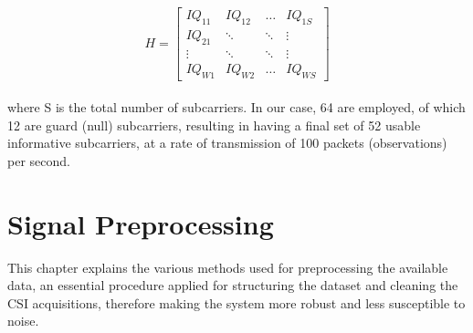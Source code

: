 \documentclass[binding=0.7cm, oneside]{sapthesis}
\begin{document}
\[
    H = \begin{bmatrix}
        IQ_{11} & IQ_{12} & \dots  & IQ_{1S} \\
        IQ_{21} & \ddots  & \ddots & \vdots  \\
        \vdots  & \ddots  & \ddots & \vdots  \\
        IQ_{W1} & IQ_{W2} & \dots  & IQ_{WS}
    \end{bmatrix}
\]
\\
where S is the total number of subcarriers. In our case, 64 are employed, of which 12 are guard (null) subcarriers, resulting in having a final set of 52
usable informative subcarriers, at a rate of transmission of 100 packets (observations) per second.

\chapter{Signal Preprocessing}
This chapter explains the various methods used for preprocessing the available data, an essential procedure applied for structuring the dataset and
cleaning the CSI acquisitions, therefore making the system more robust and less susceptible to noise.
\end{document}
